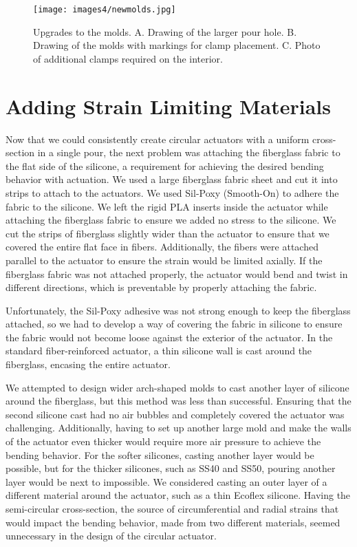 \begin{figure}[ht]
    \centering
    \texttt{[image: images4/newmolds.jpg]}
    \caption{Upgrades to the molds. A. Drawing of the larger pour hole. B. Drawing of the molds with markings for clamp placement. C. Photo of additional clamps required on the interior.}
    \label{fig:newmolds}
\end{figure}

\clearpage
\section{Adding Strain Limiting Materials}
Now that we could consistently create circular actuators with a uniform cross-section in a single pour, the next problem was attaching the fiberglass fabric to the flat side of the silicone, a requirement for achieving the desired bending behavior with actuation. We used a large fiberglass fabric sheet and cut it into strips to attach to the actuators. We used Sil-Poxy (Smooth-On) to adhere the fabric to the silicone. We left the rigid PLA inserts inside the actuator while attaching the fiberglass fabric to ensure we added no stress to the silicone. We cut the strips of fiberglass slightly wider than the actuator to ensure that we covered the entire flat face in fibers. Additionally, the fibers were attached parallel to the actuator to ensure the strain would be limited axially. If the fiberglass fabric was not attached properly, the actuator would bend and twist in different directions, which is preventable by properly attaching the fabric. 

Unfortunately, the Sil-Poxy adhesive was not strong enough to keep the fiberglass attached, so we had to develop a way of covering the fabric in silicone to ensure the fabric would not become loose against the exterior of the actuator. In the standard fiber-reinforced actuator, a thin silicone wall is cast around the fiberglass, encasing the entire actuator. 

We attempted to design wider arch-shaped molds to cast another layer of silicone around the fiberglass, but this method was less than successful. Ensuring that the second silicone cast had no air bubbles and completely covered the actuator was challenging. Additionally, having to set up another large mold and make the walls of the actuator even thicker would require more air pressure to achieve the bending behavior. For the softer silicones, casting another layer would be possible, but for the thicker silicones, such as SS40 and SS50, pouring another layer would be next to impossible. We considered casting an outer layer of a different material around the actuator, such as a thin Ecoflex silicone. Having the semi-circular cross-section, the source of circumferential and radial strains that would impact the bending behavior, made from two different materials, seemed unnecessary in the design of the circular actuator. 

